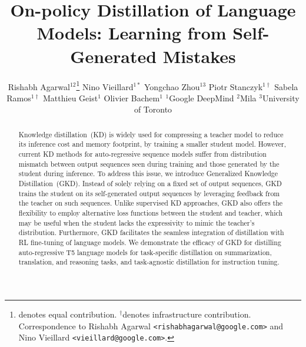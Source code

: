 \documentclass{article} %
\title{On-policy Distillation of Language Models: Learning from Self-Generated Mistakes}
\author{
Rishabh Agarwal$^{12}$\thanks{denotes equal contribution. $^\dagger$denotes infrastructure contribution. Correspondence to Rishabh Agarwal \texttt{<rishabhagarwal@google.com>} and Nino Vieillard \texttt{<vieillard@google.com>}.} \And Nino Vieillard$^{1*}$ \And Yongchao Zhou$^{13}$ \AND 
Piotr Stanczyk$^{1\dagger}$ \And Sabela Ramos$^{1\dagger}$ \And Matthieu Geist$^1$ \And Olivier Bachem$^1$ \And 
\quad  \qquad \qquad  $^1$Google DeepMind \qquad $^2$Mila \qquad $^3$University of Toronto }
\def\fullalgname{Generalized Knowledge Distillation}
\def\alg{GKD}
\newcommand{\addtext}[1]{#1}
\begin{document}
\maketitle

\vspace{-0.4cm}
\begin{abstract}


Knowledge distillation~(KD) is widely used for compressing a teacher model to reduce its inference cost and memory footprint, by training a smaller student model. However, current KD methods for auto-regressive sequence models suffer from distribution mismatch between output sequences seen during training and those generated by the student during inference. To address this issue, we introduce Generalized Knowledge Distillation~(GKD). Instead of solely relying on a fixed set of output sequences, GKD trains the student on its self-generated  output sequences by leveraging feedback from the teacher on such sequences. Unlike supervised KD approaches, GKD also offers the flexibility to employ alternative loss functions between the student and teacher, which may be useful when the student lacks the expressivity to mimic the teacher's distribution. Furthermore, GKD facilitates the seamless integration of distillation with RL fine-tuning of language models. We demonstrate the efficacy of GKD for distilling auto-regressive T5 language models for task-specific distillation on summarization, translation, and reasoning tasks, \addtext{and task-agnostic distillation for instruction tuning.} 

\end{abstract}
\end{document}
